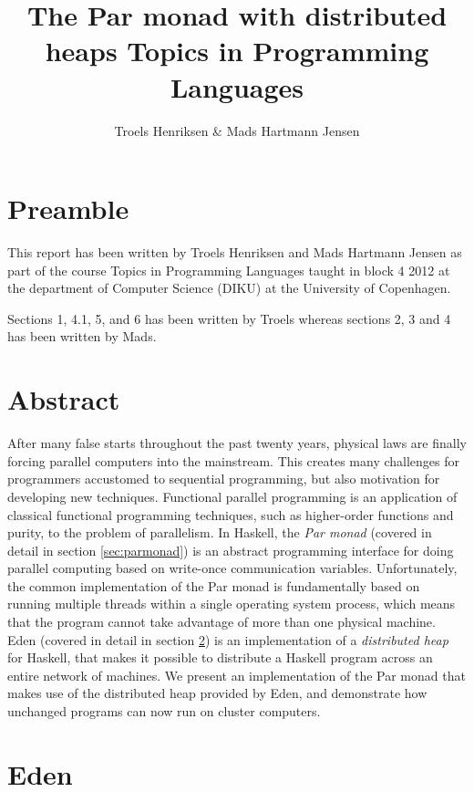 \documentclass[a4paper, oneside, final]{memoir}
\title{The Par monad with distributed heaps \newline \large{Topics in Programming Languages}}
\author{Troels Henriksen \& Mads Hartmann Jensen}
\begin{document}
\maketitle

\section*{Preamble} 

This report has been written by Troels Henriksen and Mads Hartmann
Jensen as part of the course Topics in Programming Languages taught
in block 4 2012 at the department of Computer Science (DIKU) at the
University of Copenhagen.

Sections 1, 4.1, 5, and 6 has been written by Troels whereas
sections 2, 3 and 4 has been written by Mads.

\section{Abstract}

After many false starts throughout the past twenty years, physical
laws are finally forcing parallel computers into the mainstream.  This
creates many challenges for programmers accustomed to sequential
programming, but also motivation for developing new techniques.
Functional parallel programming is an application of classical
functional programming techniques, such as higher-order functions and
purity, to the problem of parallelism.  In Haskell, the \textit{Par
  monad} (covered in detail in section \ref{sec:parmonad}) is an
abstract programming interface for doing parallel computing based on
write-once communication variables.  Unfortunately, the common
implementation of the Par monad is fundamentally based on running
multiple threads within a single operating system process, which means
that the program cannot take advantage of more than one physical
machine.  Eden (covered in detail in section \ref{sec:eden}) is an
implementation of a \textit{distributed heap} for Haskell, that makes
it possible to distribute a Haskell program across an entire network
of machines.  We present an implementation of the Par monad that makes
use of the distributed heap provided by Eden, and demonstrate how
unchanged programs can now run on cluster computers.

\newpage 

\section{Eden}
\label{sec:eden}
\end{document}
